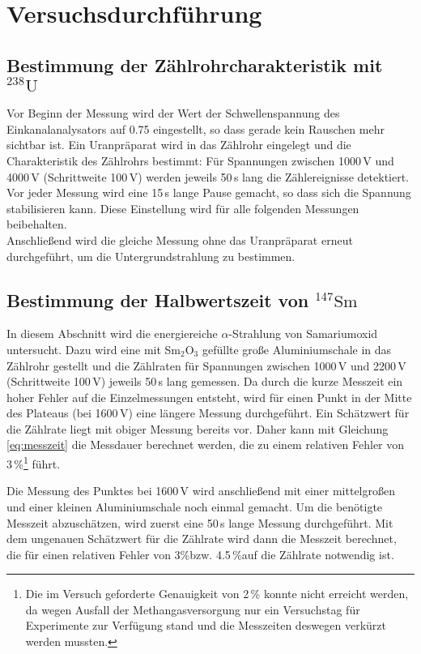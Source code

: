 \section{Versuchsdurchführung}

\subsection{Bestimmung der Zählrohrcharakteristik mit \texorpdfstring{${}^{238}\text{U}$}{U-238}}
Vor Beginn der Messung wird der Wert der Schwellenspannung des
Einkanalanalysators auf 0.75 eingestellt, so dass gerade kein Rauschen mehr
sichtbar ist. Ein Uranpräparat wird in das Zählrohr eingelegt und die
Charakteristik des Zählrohrs bestimmt: Für Spannungen zwischen 1000\,V und
4000\,V (Schrittweite 100\,V) werden jeweils 50\,s lang die Zählereignisse
detektiert. Vor jeder Messung wird eine 15\,s lange Pause gemacht, so dass sich
die Spannung stabilisieren kann. Diese Einstellung wird für alle folgenden
Messungen beibehalten.\\
Anschließend wird die gleiche Messung ohne das Uranpräparat erneut durchgeführt,
um die Untergrundstrahlung zu bestimmen.

\subsection{Bestimmung der Halbwertszeit von \texorpdfstring{${}^{147}\text{Sm}$}{Sm-147}}
In diesem Abschnitt wird die energiereiche $\alpha$-Strahlung von Samariumoxid
untersucht. Dazu wird eine mit Sm$_2$O$_3$ gefüllte große Aluminiumschale in das Zählrohr
gestellt und die Zählraten für Spannungen zwischen 1000\,V und 2200\,V
(Schrittweite 100\,V) jeweils 50\,s lang gemessen.
Da durch die kurze Messzeit ein hoher Fehler auf die Einzelmessungen entsteht,
wird für einen Punkt in der Mitte des Plateaus (bei 1600\,V) eine längere Messung durchgeführt.
Ein Schätzwert für die Zählrate liegt mit obiger Messung bereits vor. Daher kann mit Gleichung 
\ref{eq:messzeit} die Messdauer berechnet werden, die zu einem relativen Fehler von
3\,\%\footnote{Die im Versuch geforderte Genauigkeit von 2\,\% konnte nicht
erreicht werden, da wegen Ausfall der Methangasversorgung nur ein Versuchstag
für Experimente zur Verfügung stand und die Messzeiten deswegen verkürzt werden
mussten.}
führt.


Die Messung des Punktes bei 1600\,V wird anschließend mit einer mittelgroßen
und einer kleinen Aluminiumschale noch einmal gemacht.
Um die benötigte Messzeit abzuschätzen, wird zuerst eine
50\,s lange Messung durchgeführt. Mit dem ungenauen Schätzwert für die Zählrate
wird dann die Messzeit berechnet,
die für einen relativen Fehler von 3\%\footnotemark[1] bzw. 4.5\,\%\footnotemark[1]
auf die Zählrate notwendig ist.

